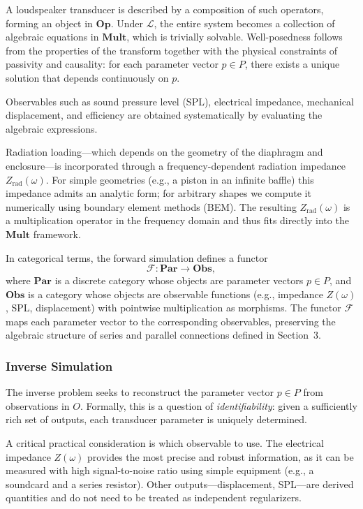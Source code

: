 A loudspeaker transducer is described by a composition of such operators, forming an object in $\mathbf{Op}$. Under $\mathcal{L}$, the entire system becomes a collection of algebraic equations in $\mathbf{Mult}$, which is trivially solvable. Well-posedness follows from the properties of the transform together with the physical constraints of passivity and causality: for each parameter vector $p \in P$, there exists a unique solution that depends continuously on $p$.

Observables such as sound pressure level (SPL), electrical impedance, mechanical displacement, and efficiency are obtained systematically by evaluating the algebraic expressions.

Radiation loading—which depends on the geometry of the diaphragm and enclosure—is incorporated through a frequency-dependent radiation impedance $Z_{\text{rad}}(\omega)$. For simple geometries (e.g., a piston in an infinite baffle) this impedance admits an analytic form; for arbitrary shapes we compute it numerically using boundary element methods (BEM). The resulting $Z_{\text{rad}}(\omega)$ is a multiplication operator in the frequency domain and thus fits directly into the $\mathbf{Mult}$ framework.

In categorical terms, the forward simulation defines a functor
\[
\mathcal{F}: \mathbf{Par} \longrightarrow \mathbf{Obs},
\]
where $\mathbf{Par}$ is a discrete category whose objects are parameter vectors $p \in P$, and $\mathbf{Obs}$ is a category whose objects are observable functions (e.g., impedance $Z(\omega)$, SPL, displacement) with pointwise multiplication as morphisms. The functor $\mathcal{F}$ maps each parameter vector to the corresponding observables, preserving the algebraic structure of series and parallel connections defined in Section~3.

\subsubsection{Inverse Simulation}

The inverse problem seeks to reconstruct the parameter vector $p \in P$ from observations in $O$. Formally, this is a question of \emph{identifiability}: given a sufficiently rich set of outputs, each transducer parameter is uniquely determined.

A critical practical consideration is which observable to use. The electrical impedance $Z(\omega)$ provides the most precise and robust information, as it can be measured with high signal-to-noise ratio using simple equipment (e.g., a soundcard and a series resistor). Other outputs—displacement, SPL—are derived quantities and do not need to be treated as independent regularizers.

